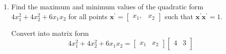 \begin{enumerate}[font=\bfseries]
\[            \left(
            \frac{1}{6}
            \begin{bNiceMatrix}
                5 & 2 \\
                2 & 5
            \end{bNiceMatrix}
            \right)
            \begin{bNiceMatrix}[r]
                1 \\
                1
            \end{bNiceMatrix}
            =
            \left(
            \frac{1}{6}
            \right)
            \begin{bNiceMatrix}
                7 & 4 \\
            \end{bNiceMatrix}
            \begin{bNiceMatrix}[r]
                1 \\
                1
            \end{bNiceMatrix}
            =
            \frac{11}{6}
        \]
        \[
            {\left(\textbf{b}^\prime\textbf{B}\textbf{b}\right)}
            {\left(\textbf{d}^\prime\textbf{B}^{-1}\textbf{d}\right)}
            =
            125 \times \frac{11}{6}
            =
            \frac{1375}{6} = 229.16\bar{6}
        \]
        \[
            1
            =
            {\left(\textbf{b}^\prime\textbf{d}\right)}^2
            <
            {\left(\textbf{b}^\prime\textbf{B}\textbf{b}\right)}
            {\left(\textbf{d}^\prime\textbf{B}^{-1}\textbf{d}\right)}
            =
            229.16\bar{6}
        \]
        \item[2.36] Find the maximum and minimum values of the quadratic form $4x_1^2 + 4x_2^2 + 6x_1x_2$ for all points $\mathbf{x}^\prime = \begin{bmatrix}
            x_1, & x_2
        \end{bmatrix}$ such that $\mathbf{x}^\prime\mathbf{x}^\prime = 1$.
        \par
        Convert into matrix form
        \[
            4x_1^2 + 4x_2^2 + 6x_1x_2
            =
            \begin{bmatrix}
                x_1 & x_2
            \end{bmatrix}
            \begin{bmatrix}
                4 & 3 \\

\end{bmatrix}\]
\end{enumerate}
